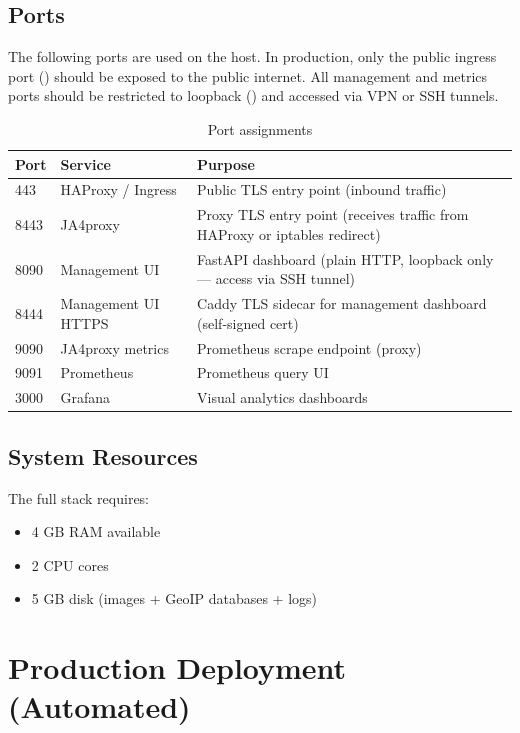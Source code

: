 \subsection{Ports}

The following ports are used on the host. In production, only the public ingress port () should be exposed to the public internet. All management and metrics ports should be restricted to loopback () and accessed via VPN or SSH tunnels.

\begin{table}[ht]
  \small
  \begin{tabularx}{\linewidth}{llX}
    \toprule
    \textbf{Port} & \textbf{Service} & \textbf{Purpose} \\
    \midrule
    443 & HAProxy / Ingress & Public TLS entry point (inbound traffic) \\
    8443 & JA4proxy & Proxy TLS entry point (receives traffic from HAProxy or iptables redirect) \\
    8090 & Management UI & FastAPI dashboard (plain HTTP, loopback only — access via SSH tunnel) \\
    8444 & Management UI HTTPS & Caddy TLS sidecar for management dashboard (self-signed cert) \\
    9090 & JA4proxy metrics & Prometheus scrape endpoint (proxy) \\
    9091 & Prometheus & Prometheus query UI \\
    3000 & Grafana & Visual analytics dashboards \\
    \bottomrule
  \end{tabularx}
  \caption{Port assignments}
\end{table}

\subsection{System Resources}

The full stack requires:
\begin{itemize}
  \item 4 GB RAM available
  \item 2 CPU cores
  \item 5 GB disk (images + GeoIP databases + logs)
\end{itemize}

\section{Production Deployment (Automated)}

